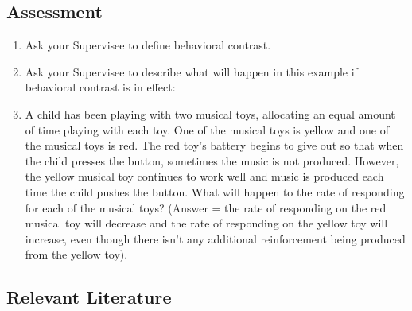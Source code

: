 \subsection{Assessment}
\begin{enumerate}
\item Ask your Supervisee to define behavioral contrast.
\item Ask your Supervisee to describe what will happen in this example if behavioral contrast is in effect: 
\item A child has been playing with two musical toys, allocating an equal amount of time playing with each toy. One of the musical toys is yellow and one of the musical toys is red. The red toy's battery begins to give out so that when the child presses the button, sometimes the music is not produced. However, the yellow musical toy continues to work well and music is produced each time the child pushes the button. What will happen to the rate of responding for each of the musical toys? (Answer = the rate of responding on the red musical toy will decrease and the rate of responding on the yellow toy will increase, even though there isn't any additional reinforcement being produced from the yellow toy).
\end{enumerate}
%
\subsection{Relevant Literature}
\begin{refsection}
\nocite{test,alang2017police,clayton2018black}
\printbibliography[heading=none]
\end{refsection}
%
